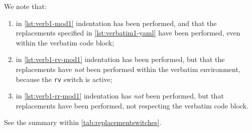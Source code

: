 	We note that:
	\begin{enumerate}
		\item in \cref{lst:verb1-mod1} indentation has been performed, and that the replacements
		      specified in \cref{lst:verbatim1-yaml} have been performed, even within the verbatim code
		      block;
		\item in \cref{lst:verb1-rv-mod1} indentation has been performed, but that the replacements have
		      \emph{not} been performed within the verbatim environment, because the
		      \texttt{rv} switch is active;
		\item in \cref{lst:verb1-rr-mod1} indentation has \emph{not} been performed, but
		      that replacements have been performed, not respecting the verbatim code block.
	\end{enumerate}
	See the summary within \vref{tab:replacementswitches}.


